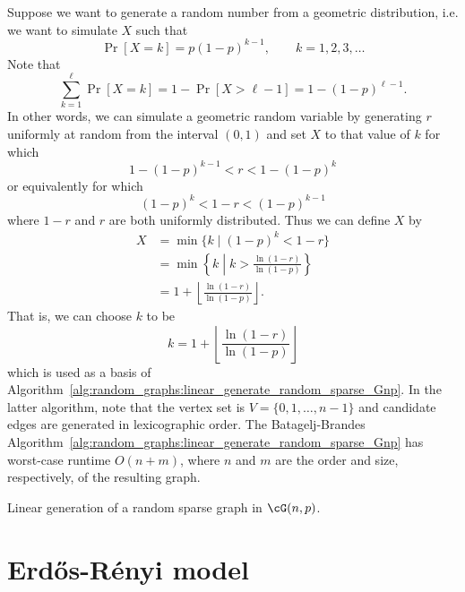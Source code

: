 Suppose we want to generate a random
number from a
geometric distribution, i.e. we want to
simulate $X$ such that
\[
\Pr[X = k]
=
p (1 - p)^{k-1},
\qquad
k = 1, 2, 3, \dots
\]
Note that
\[
\sum_{k=1}^{\ell} \Pr[X=k]
=
1 - \Pr[X > \ell - 1]
=
1 - (1 - p)^{\ell - 1}.
\]
In other words, we can simulate a
geometric random variable by
generating $r$ uniformly at random from the interval $(0,1)$ and set
$X$ to that value of $k$ for which
\[
1 - (1 - p)^{k-1} < r < 1 - (1 - p)^k
\]
or equivalently for which
\[
(1 - p)^k < 1 - r < (1 - p)^{k-1}
\]
where $1 - r$ and $r$ are both uniformly
distributed. Thus we can define $X$ by
\begin{align*}
X
&=
\min\{k \mid (1 - p)^k < 1 - r\} \\[4pt]
&=
\min\left\{
  k \;\left|\; k > \frac{\ln(1 - r)} {\ln(1 - p)} \right.
\right\} \\[4pt]
&=
1 + \left\lfloor \frac{\ln(1 - r)} {\ln(1 - p)} \right\rfloor.
\end{align*}
That is, we can choose $k$ to be
\[
k
=
1 + \left\lfloor \frac{\ln(1 - r)} {\ln(1 - p)} \right\rfloor
\]
which is used as a basis of
Algorithm~\ref{alg:random_graphs:linear_generate_random_sparse_Gnp}. In
the latter algorithm, note that the vertex set is
$V = \{0, 1, \dots, n-1\}$ and candidate edges are generated in
lexicographic order. The Batagelj-Brandes
Algorithm~\ref{alg:random_graphs:linear_generate_random_sparse_Gnp}
has worst-case runtime $O(n + m)$, where $n$ and $m$ are the order and
size, respectively, of the resulting graph.

\begin{algorithm}[!htbp]

\caption{Linear generation of a random sparse graph in $\cG(n,p)$.}
\label{alg:random_graphs:linear_generate_random_sparse_Gnp}
\end{algorithm}



\section{Erd\H{o}s-R\'enyi model}
\label{sec:random_graphs:Erdos_Renyi_model}

